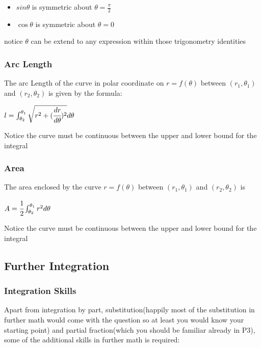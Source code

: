 \documentclass[]{article}
\begin{document}
\begin{itemize}
\item
  \(sin\theta\) is symmetric about \(\theta = \frac{\pi}{2}\)
\item
  \(\cos\theta\) is symmetric about \(\theta = 0\)
\end{itemize}

notice \(\theta\) can be extend to any expression within those
trigonometry identities

\subsubsection{Arc Length}\label{header-n109}

The arc Length of the curve in polar coordinate on \(r = f(\theta)\)
between \((r_1,\theta_1)\) and \((r_2,\theta_2)\) is given by the
formula:

\(l = \int^{\theta_1}_{\theta_2} \sqrt{r^2 + (\cfrac{dr}{d\theta})^2}d\theta\)

Notice the curve must be continuous between the upper and lower bound
for the integral

\subsubsection{Area}\label{header-n113}

The area enclosed by the curve \(r = f(\theta)\) between
\((r_1,\theta_1)\) and \((r_2,\theta_2)\) is

\(A= \cfrac{1}{2}\int^{\theta_1}_{\theta_2} r^2d\theta\)

Notice the curve must be continuous between the upper and lower bound
for the integral

\subsection{Further Integration}\label{header-n117}

\subsubsection{Integration Skills}\label{header-n118}

Apart from integration by part, substitution(happily most of the
substitution in further math would come with the question so at least
you would know your starting point) and partial fraction(which you
should be familiar already in P3), some of the additional skills in
further math is required:
\end{document}
